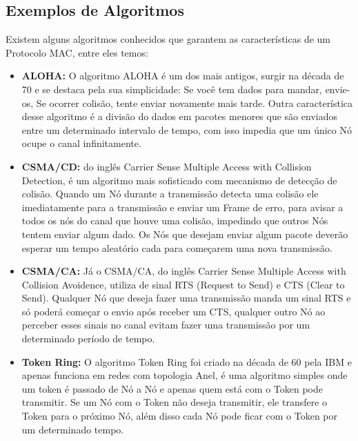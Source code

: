 \subsection{Exemplos de Algoritmos}

Existem alguns algoritmos conhecidos que garantem as características de um Protocolo MAC,
entre eles temos: \cite{5340799}

\begin{itemize}
    \item \textbf{ALOHA:} O algoritmo ALOHA é um dos mais antigos, surgir na década de 70
    e se destaca pela sua simplicidade: Se você tem dados para mandar, envie-os, Se ocorrer colisão, tente enviar novamente mais tarde. Outra característica desse algoritmo é a divisão
    do dados em pacotes menores que são enviados entre um determinado intervalo de tempo, com isso
    impedia que um único Nó ocupe o canal infinitamente.
    \item \textbf{CSMA/CD:} do inglês Carrier Sense Multiple Access with Collision Detection,
    é um algoritmo mais sofisticado com mecanismo de detecção de colisão. Quando um Nó durante
    a transmissão detecta uma colisão ele imediatamente para a transmissão e enviar um Frame
    de erro, para avisar a todos os nós do canal que houve uma colisão, impedindo que outros
    Nós tentem enviar algum dado. Os Nós que desejam enviar algum pacote deverão esperar um tempo
    aleatório cada para começarem uma nova transmissão.
    \item \textbf{CSMA/CA:} Já o CSMA/CA, do inglês Carrier Sense Multiple Access with Collision Avoidence, utiliza de sinal RTS (Request to Send) e CTS (Clear to Send). Qualquer Nó que
    deseja fazer uma transmissão manda um sinal RTS e só poderá começar o envio após receber
    um CTS, qualquer outro Nó ao perceber esses sinais no canal evitam fazer uma transmissão
    por um determinado período de tempo.
    \item \textbf{Token Ring:} O algoritmo Token Ring foi criado na década de 60 pela IBM e
    apenas funciona em redes com topologia Anel, é uma algoritmo simples onde um token é passado
    de Nó a Nó e apenas quem está com o Token pode transmitir. Se um Nó com o Token não deseja
    transmitir, ele transfere o Token para o próximo Nó, além disso cada Nó pode ficar com o
    Token por um determinado tempo.
\end{itemize}